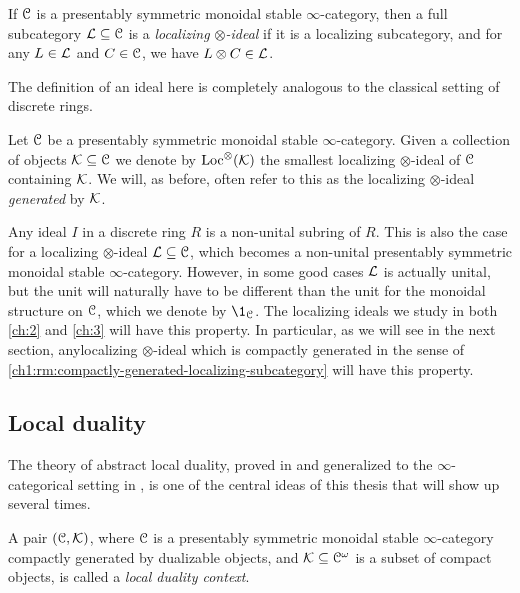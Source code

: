 \begin{definition}
    \label{ch1:def:localizing-ideal}
    If $\EuScript{C}$ is a presentably symmetric monoidal stable $\infty$-category, then a full subcategory $\mathcal{L}\subseteq \EuScript{C}$ is a \emph{localizing $\otimes$-ideal} if it is a localizing subcategory, and for any $L\in \mathcal{L}$ and $C\in \EuScript{C}$, we have $L\otimes C\in \mathcal{L}$. 
\end{definition}

The definition of an ideal here is completely analogous to the classical setting of discrete rings. 

\begin{definition}
    Let $\EuScript{C}$ be a presentably symmetric monoidal stable $\infty$-category. Given a collection of objects $\mathcal{K}\subseteq \EuScript{C}$ we denote by $\operatorname{Loc}^\otimes(\mathcal{K})$ the smallest localizing $\otimes$-ideal of $\EuScript{C}$ containing $\mathcal{K}$. We will, as before, often refer to this as the localizing $\otimes$-ideal \emph{generated} by $\mathcal{K}$. 
\end{definition}

Any ideal $I$ in a discrete ring $R$ is a non-unital subring of $R$. This is also the case for a localizing $\otimes$-ideal $\mathcal{L}\subseteq \EuScript{C}$, which becomes a non-unital presentably symmetric monoidal stable $\infty$-category. However, in some good cases $\mathcal{L}$ is actually unital, but the unit will naturally have to be different than the unit for the monoidal structure on $\EuScript{C}$, which we denote by $\1_\C$. The localizing ideals we study in both \cref{ch:2} and \cref{ch:3} will have this property. In particular, as we will see in the next section, anylocalizing $\otimes$-ideal which is compactly generated in the sense of \cref{ch1:rm:compactly-generated-localizing-subcategory} will have this property.


\subsection{Local duality}
\label{ch1:ssec:local-duality}

The theory of abstract local duality, proved in \cite{hovey-palmiery-strickland_97} and generalized to the $\infty$-categorical setting in \cite{barthel-heard-valenzuela_2018}, is one of the central ideas of this thesis that will show up several times. 

\begin{definition}
    \label{ch1:def:local-duality-context}
    A pair $(\EuScript{C}, \mathcal{K})$, where $\EuScript{C}$ is a presentably symmetric monoidal stable $\infty$-category compactly generated by dualizable objects, and $\mathcal{K}\subseteq \EuScript{C}^\omega$ is a subset of compact objects, is called a \emph{local duality context}.
\end{definition}

